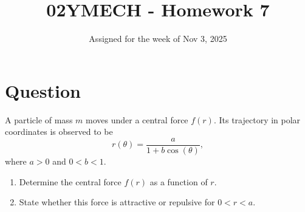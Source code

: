 \documentclass[12pt]{article}
\title{02YMECH - Homework 7}
\date{Assigned for the week of Nov 3, 2025}
\author{}
\begin{document}
\maketitle

\section*{Question}

    A particle of mass $m$ moves under a central force $f(r)$.  
    Its trajectory in polar coordinates is observed to be
    \[
        r(\theta)=\frac{a}{1+b\cos(\theta)},
    \]
    where $a>0$ and $0<b<1$. 

    \begin{enumerate}
        \item Determine the central force $f(r)$ as a function of $r$.
        \item State whether this force is attractive or repulsive for $0<r<a$.
    \end{enumerate} 
\end{document}

